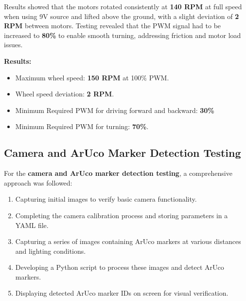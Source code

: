 Results showed that the motors rotated consistently at \textbf{140 RPM} at full speed when using 9V source and lifted above the ground, with a slight deviation of \textbf{2 RPM} between motors. Testing revealed that the PWM signal had to be increased to \textbf{80\%} to enable smooth turning, addressing friction and motor load issues.

\textbf{Results:}
\begin{itemize}
	\item Maximum wheel speed: \textbf{150 RPM} at 100\% PWM.
	\item Wheel speed deviation: \textbf{2 RPM}.
	\item Minimum Required PWM for driving forward and backward: \textbf{30\%}
	\item Minimum Required PWM for turning: \textbf{70\%}.
\end{itemize}

\subsection{Camera and ArUco Marker Detection Testing}
For the \textbf{camera and ArUco marker detection testing}, a comprehensive approach was followed:
\begin{enumerate}
	\item Capturing initial images to verify basic camera functionality.
	\item Completing the camera calibration process and storing parameters in a YAML file.
	\item Capturing a series of images containing ArUco markers at various distances and lighting conditions.
	\item Developing a Python script to process these images and detect ArUco markers.
	\item Displaying detected ArUco marker IDs on screen for visual verification.
\end{enumerate}

